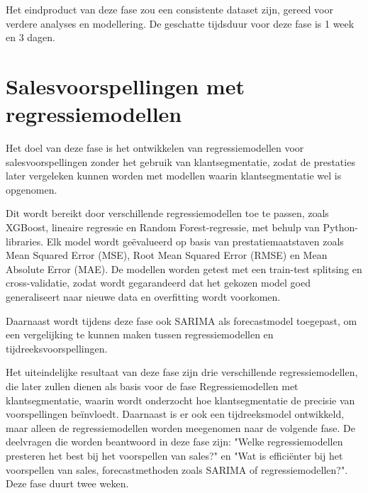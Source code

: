 \vspace{1 em}

Het eindproduct van deze fase zou een consistente dataset zijn, gereed voor verdere analyses en modellering. De geschatte tijdsduur voor deze fase is 1 week en 3 dagen.

\newpage

\section{Salesvoorspellingen met regressiemodellen}


Het doel van deze fase is het ontwikkelen van regressiemodellen voor salesvoorspellingen zonder het gebruik van klantsegmentatie, zodat de prestaties later vergeleken kunnen worden met modellen waarin klantsegmentatie wel is opgenomen.

\vspace{1 em}

Dit wordt bereikt door verschillende regressiemodellen toe te passen, zoals XGBoost, lineaire regressie en Random Forest-regressie, met behulp van Python-libraries. Elk model wordt geëvalueerd op basis van prestatiemaatstaven zoals Mean Squared Error (MSE), Root Mean Squared Error (RMSE) en Mean Absolute Error (MAE). De modellen worden getest met een train-test splitsing en cross-validatie, zodat wordt gegarandeerd dat het gekozen model goed generaliseert naar nieuwe data en overfitting wordt voorkomen.

\vspace{1 em}

Daarnaast wordt tijdens deze fase ook SARIMA als forecastmodel toegepast, om een vergelijking te kunnen maken tussen regressiemodellen en tijdreeksvoorspellingen.

\vspace{1 em}

Het uiteindelijke resultaat van deze fase zijn drie verschillende regressiemodellen, die later zullen dienen als basis voor de fase Regressiemodellen met klantsegmentatie, waarin wordt onderzocht hoe klantsegmentatie de precisie van voorspellingen beïnvloedt. Daarnaast is er ook een tijdreeksmodel ontwikkeld, maar alleen de regressiemodellen worden meegenomen naar de volgende fase. De deelvragen die worden beantwoord in deze fase zijn: "Welke regressiemodellen presteren het best bij het voorspellen van sales?" en "Wat is efficiënter bij het voorspellen van sales, forecastmethoden zoals SARIMA of regressiemodellen?". Deze fase duurt twee weken.


